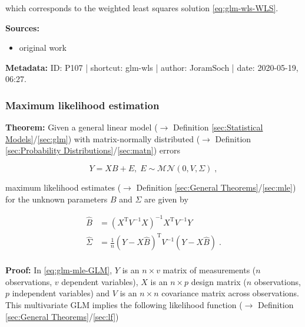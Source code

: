 \documentclass[a4paper,12pt,twoside]{book}
\begin{document}
which corresponds to the weighted least squares solution \eqref{eq:glm-wls-WLS}.


\vspace{1em}
\textbf{Sources:}
\begin{itemize}
\item original work\end{itemize}


\vspace{1em}
\textbf{Metadata:} ID: P107 | shortcut: glm-wls | author: JoramSoch | date: 2020-05-19, 06:27.
\vspace{1em}



\subsubsection[\textbf{Maximum likelihood estimation}]{Maximum likelihood estimation} \label{sec:glm-mle}
\setcounter{equation}{0}

\textbf{Theorem:} Given a general linear model ($\rightarrow$ Definition \ref{sec:Statistical Models}/\ref{sec:glm}) with matrix-normally distributed ($\rightarrow$ Definition \ref{sec:Probability Distributions}/\ref{sec:matn}) errors

\begin{equation} \label{eq:glm-mle-GLM}
Y = X B + E, \; E \sim \mathcal{MN}(0, V, \Sigma) \; ,
\end{equation}

maximum likelihood estimates ($\rightarrow$ Definition \ref{sec:General Theorems}/\ref{sec:mle}) for the unknown parameters $B$ and $\Sigma$ are given by

\begin{equation} \label{eq:glm-mle-GLM-MLE}
\begin{split}
\hat{B} &= (X^\mathrm{T} V^{-1} X)^{-1} X^\mathrm{T} V^{-1} Y \\
\hat{\Sigma} &= \frac{1}{n} (Y - X\hat{B})^\mathrm{T} V^{-1} (Y - X\hat{B}) \; . \\
\end{split}
\end{equation}


\vspace{1em}
\textbf{Proof:} In \eqref{eq:glm-mle-GLM}, $Y$ is an $n \times v$ matrix of measurements ($n$ observations, $v$ dependent variables), $X$ is an $n \times p$ design matrix ($n$ observations, $p$ independent variables) and $V$ is an $n \times n$ covariance matrix across observations. This multivariate GLM implies the following likelihood function ($\rightarrow$ Definition \ref{sec:General Theorems}/\ref{sec:lf})
\end{document}
